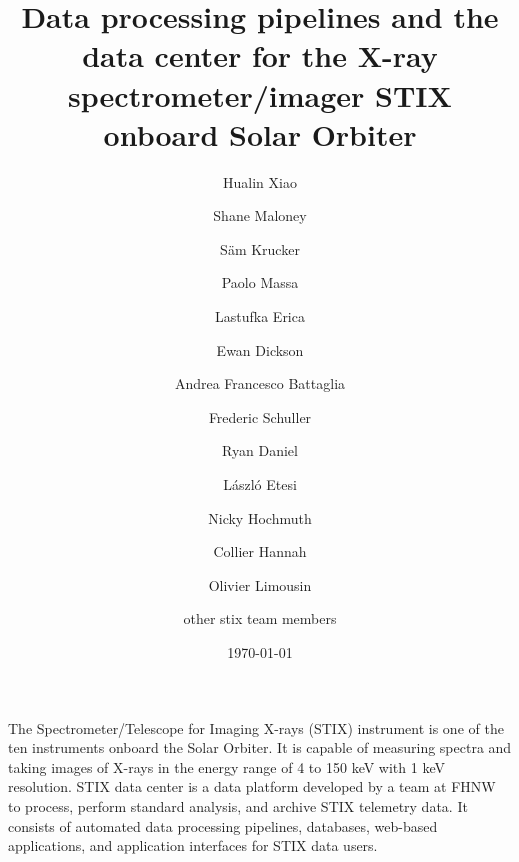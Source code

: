 \documentclass[referee]{aa} %
\begin{document}
 


   \title{Data processing pipelines and the data center for the X-ray spectrometer/imager STIX onboard Solar Orbiter}

   \subtitle{}

   \author{Hualin Xiao
          \and 
          Shane Maloney 
          \and S\"am Krucker
          \and Paolo Massa 
          \and Lastufka Erica 
              \and Ewan Dickson 
          \and Andrea Francesco Battaglia
          \and Frederic Schuller 
          \and Ryan Daniel 
          \and László Etesi 
          \and Nicky Hochmuth 
          \and Collier Hannah 
          \and Olivier Limousin 
          \and other stix team members
         }


   \date{\today}

 
  \abstract
   {The Spectrometer/Telescope for Imaging X-rays (STIX) instrument is one 
   of the ten instruments onboard the Solar Orbiter.  It is capable of measuring spectra and taking images of X-rays in the energy range of 4 to 150 keV with 1 keV resolution.   } %
   {STIX data center is a data platform developed by a team at FHNW to process, perform standard analysis, and archive STIX telemetry data. 
   It consists of automated data processing pipelines, databases, 
   web-based applications, and application interfaces for STIX data users.  }
\end{document}
